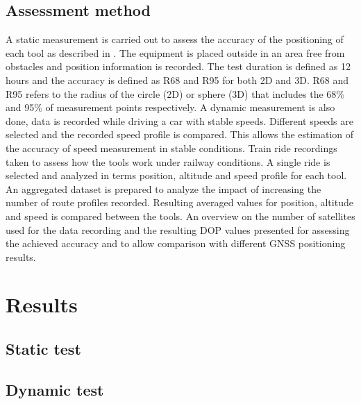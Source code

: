 \documentclass{article}
\begin{document}
		\subsection{Assessment method}
			A static measurement is carried out to assess the accuracy of the positioning of each tool as described in \cite{szotComparativeAnalysisPositioning2019}. The equipment is placed outside in an area free from obstacles and position information is recorded. The test duration is defined as 12 hours and the accuracy is defined as R68 and R95 for both 2D and 3D. R68 and R95 refers to the radius of the circle (2D) or sphere (3D) that includes the 68\% and 95\% of measurement points respectively. 
			A dynamic measurement is also done, data is recorded while driving a car with stable speeds. Different speeds are selected and the recorded speed profile is compared. This allows the estimation of the accuracy of speed measurement in stable conditions. 
			Train ride recordings taken to assess how the tools work under railway conditions. A single ride is selected and analyzed in terms position, altitude and speed profile for each tool. An aggregated dataset is prepared to analyze the impact of increasing the number of route profiles recorded. Resulting averaged values for position, altitude and speed is compared between the tools. 
			An overview on the number of satellites used for the data recording and the resulting DOP values presented for assessing the achieved accuracy and to allow comparison with different GNSS positioning results.
	\section{Results}
		\subsection{Static test}
		\subsection{Dynamic test}
\end{document}
